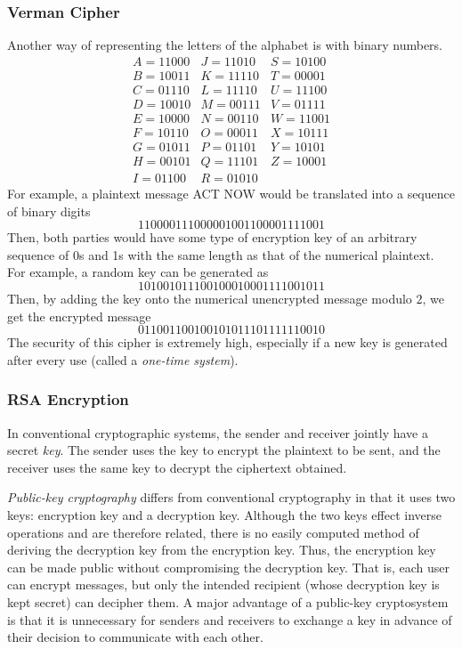 \documentclass{article}
\theoremstyle{remark}
\theoremstyle{definition}
\begin{document}
\subsubsection{Verman Cipher}
Another way of representing the letters of the alphabet is with binary numbers. 
\[\begin{array}{ccc}
    A = 11000 & J = 11010 & S = 10100 \\
    B = 10011 & K = 11110 & T = 00001 \\
    C = 01110 & L = 11110 & U = 11100 \\
    D = 10010 & M = 00111 & V = 01111 \\
    E = 10000 & N = 00110 & W = 11001 \\
    F = 10110 & O = 00011 & X = 10111 \\
    G = 01011 & P = 01101 & Y = 10101 \\
    H = 00101 & Q = 11101 & Z = 10001 \\
    I = 01100 & R = 01010
\end{array}\]
For example, a plaintext message ACT NOW would be translated into a sequence of binary digits
\[110000111000001001100001111001\]
Then, both parties would have some type of encryption key of an arbitrary sequence of 0s and 1s with the same length as that of the numerical plaintext. For example, a random key can be generated as
\[101001011100100010001111001011\]
Then, by adding the key onto the numerical unencrypted message modulo $2$, we get the encrypted message
\[011001100100101011101111110010\]
The security of this cipher is extremely high, especially if a new key is generated after every use (called a \textit{one-time system}). 

\subsubsection{RSA Encryption}
In conventional cryptographic systems, the sender and receiver jointly have a secret \textit{key}. The sender uses the key to encrypt the plaintext to be sent, and the receiver uses the same key to decrypt the ciphertext obtained. 

\textit{Public-key cryptography} differs from conventional cryptography in that it uses two keys: encryption key and a decryption key. Although the two keys effect inverse operations and are therefore related, there is no easily computed method of deriving the decryption key from the encryption key. Thus, the encryption key can be made public without compromising the decryption key. That is, each user can encrypt messages, but only the intended recipient (whose decryption key is kept secret) can decipher them. A major advantage of a public-key cryptosystem is that it is unnecessary for senders and receivers to exchange a key in advance of their decision to communicate with each other. 
\end{document}
